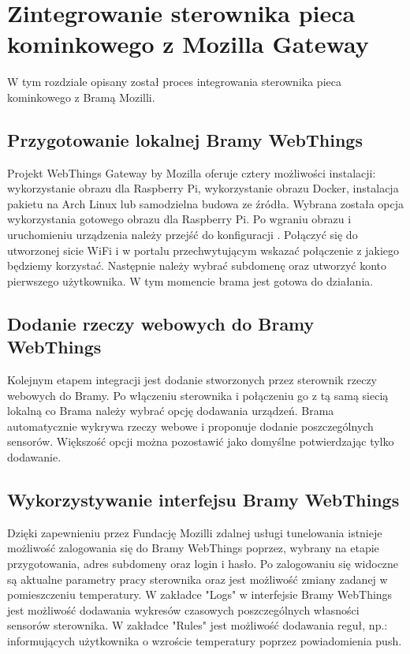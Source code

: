 \documentclass[11pt]{report}
\begin{document}
 \chapter{Zintegrowanie sterownika pieca kominkowego z Mozilla Gateway}\label{ch:gateway}
 W tym rozdziale opisany został proces integrowania sterownika pieca kominkowego z Bramą Mozilli.
 
 \section{Przygotowanie lokalnej Bramy WebThings}
  Projekt WebThings Gateway by Mozilla oferuje cztery możliwości instalacji: wykorzystanie obrazu dla Raspberry Pi, wykorzystanie obrazu Docker, instalacja pakietu na Arch Linux lub samodzielna budowa ze źródła. Wybrana została opcja wykorzystania gotowego obrazu dla Raspberry Pi.
  Po wgraniu obrazu i uruchomieniu urządzenia należy przejść do konfiguracji \cite{gatewaystarted2019}. Połączyć się do utworzonej sicie WiFi i w portalu przechwytującym wskazać połączenie z jakiego będziemy korzystać. Następnie należy wybrać subdomenę oraz utworzyć konto pierwszego użytkownika. W tym momencie brama jest gotowa do działania.

 \section{Dodanie rzeczy webowych do Bramy WebThings}
 Kolejnym etapem integracji jest dodanie stworzonych przez sterownik rzeczy webowych do Bramy. Po włączeniu sterownika i połączeniu go z tą samą siecią lokalną co Brama należy wybrać opcję dodawania urządzeń. Brama automatycznie wykrywa rzeczy webowe i proponuje dodanie poszczególnych sensorów. Większość opcji można pozostawić jako domyślne potwierdzając tylko dodawanie.
 
 \section{Wykorzystywanie interfejsu Bramy WebThings}
 Dzięki zapewnieniu przez Fundację Mozilli zdalnej usługi tunelowania istnieje możliwość zalogowania się do Bramy WebThings poprzez, wybrany na etapie przygotowania, adres subdomeny oraz login i hasło. Po zalogowaniu się widoczne są aktualne parametry pracy sterownika oraz jest możliwość zmiany zadanej w pomieszczeniu temperatury. W zakładce "Logs" w interfejsie Bramy WebThings jest możliwość dodawania wykresów czasowych poszczególnych własności sensorów sterownika. W zakładce "Rules" jest możliwość dodawania reguł, np.: informujących użytkownika o wzroście temperatury poprzez powiadomienia push.
 
\end{document}
